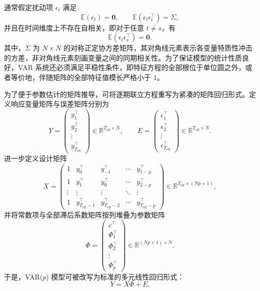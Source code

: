 \documentclass[UTF8,a4paper,12pt]{ctexbook}
\begin{document}
通常假定扰动项 $\epsilon_t$ 满足
\begin{equation}
 \mathbb{E}(\epsilon_t)=\bm{0}, \qquad \mathbb{E}(\epsilon_t\epsilon_t^{\top})=\Sigma,
\end{equation}
并且在时间维度上不存在自相关，即对于任意 $t\neq s$，有
\begin{equation}
 \mathbb{E}(\epsilon_t\epsilon_s^{\top})=\bm{0}.
\end{equation}
其中，$\Sigma$ 为 $N\times N$ 的对称正定协方差矩阵，其对角线元素表示各变量特质性冲击的方差，非对角线元素刻画变量之间的同期相关性。为了保证模型的统计性质良好，VAR 系统还必须满足平稳性条件，即特征方程的全部根位于单位圆之外，或者等价地，伴随矩阵的全部特征值模长严格小于 $1$。

为了便于参数估计的矩阵推导，可将逐期联立方程重写为紧凑的矩阵回归形式。定义响应变量矩阵与误差矩阵分别为
\begin{equation}
 Y=
 \begin{pmatrix}
 y_1^{\top}\\
 y_2^{\top}\\
 \vdots\\
 y_{T_{\mathrm{eff}}}^{\top}
 \end{pmatrix}
 \in\mathbb{R}^{T_{\mathrm{eff}}\times N},
 \qquad
 E=
 \begin{pmatrix}
 \epsilon_1^{\top}\\
 \epsilon_2^{\top}\\
 \vdots\\
 \epsilon_{T_{\mathrm{eff}}}^{\top}
 \end{pmatrix}
 \in\mathbb{R}^{T_{\mathrm{eff}}\times N}.
\end{equation}
进一步定义设计矩阵
\begin{equation}
 X=
 \begin{pmatrix}
 1 & y_0^{\top} & y_{-1}^{\top} & \cdots & y_{1-p}^{\top}\\
 1 & y_1^{\top} & y_0^{\top} & \cdots & y_{2-p}^{\top}\\
 \vdots & \vdots & \vdots & \ddots & \vdots\\
 1 & y_{T_{\mathrm{eff}}-1}^{\top} & y_{T_{\mathrm{eff}}-2}^{\top} & \cdots & y_{T_{\mathrm{eff}}-p}^{\top}
 \end{pmatrix}
 \in\mathbb{R}^{T_{\mathrm{eff}}\times (Np+1)},
\end{equation}
并将常数项与全部滞后系数矩阵按列堆叠为参数矩阵
\begin{equation}
 \Phi=
 \begin{pmatrix}
 c^{\top}\\
 \Phi_1^{\top}\\
 \Phi_2^{\top}\\
 \vdots\\
 \Phi_p^{\top}
 \end{pmatrix}
 \in\mathbb{R}^{(Np+1)\times N}.
\end{equation}
于是，VAR($p$) 模型可被改写为标准的多元线性回归形式：
\begin{equation}
 Y=X\Phi+E.
\end{equation}
\end{document}
